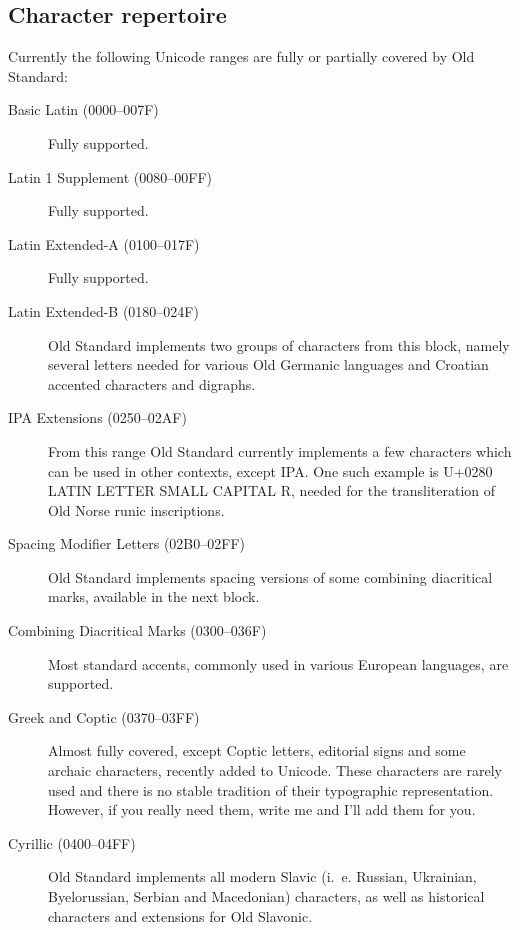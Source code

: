 \documentclass[12pt,a4paper,openany]{book}
\begin{document}
\subsection{Character repertoire}

Currently the following Unicode ranges are fully or partially covered by
Old Standard:

\begin{description}

\item[Basic Latin (0000–007F)] Fully supported.

\item[Latin 1 Supplement (0080–00FF)] Fully supported.

\item[Latin Extended-A (0100–017F)] Fully supported.

\item[Latin Extended-B (0180–024F)] Old Standard implements two groups of
characters from this block, namely several letters needed for various Old
Germanic languages and Croatian accented characters and digraphs.

\item[IPA Extensions (0250–02AF)] From this range Old Standard currently
implements a few characters which can be used in other contexts, except IPA.
One such example is U+0280 LATIN LETTER SMALL CAPITAL R, needed for the
transliteration of Old Norse runic inscriptions.

\item[Spacing Modifier Letters (02B0–02FF)] Old Standard implements spacing
versions of some combining diacritical marks, available in the next block.

\item[Combining Diacritical Marks (0300–036F)] Most standard accents,
commonly used in various European languages, are supported.

\item[Greek and Coptic (0370–03FF)] Almost fully covered, except Coptic
letters, editorial signs and some archaic characters, recently added to
Unicode. These characters are rarely used and there is no stable tradition
of their typographic representation. However, if you really need them,
write me and I’ll add them for you.

\item[Cyrillic (0400–04FF)] Old Standard implements all modern Slavic
(i.~e. Russian, Uk\-rai\-nian, Byelorussian, Serbian and Macedonian)
characters, as well as historical characters and extensions for Old
Slavonic.


\end{description}
\end{document}
